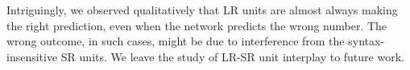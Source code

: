 Intriguingly, we observed qualitatively that LR units are almost
always making the right prediction, even when the network predicts the
wrong number. The wrong outcome, in such cases, might be due to
interference from the syntax-insensitive SR units. We leave the study of LR-SR
unit interplay to future work.

